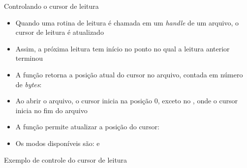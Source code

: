 \begin{frame}[fragile]{Controlando o cursor de leitura}

    \begin{itemize}
        \item Quando uma rotina de leitura é chamada em um \textit{handle} de um arquivo, o cursor
            de leitura é atualizado

        \item Assim, a próxima leitura tem início no ponto no qual a leitura anterior terminou

        \item A função  retorna a posição atual do cursor no arquivo,
            contada em número de \textit{bytes}:


        \item Ao abrir o arquivo, o cursor inicia na posição 0, exceto no
            , onde o cursor inicia no fim do arquivo

        \item A função  permite atualizar a posição do cursor:

            
        \item Os modos disponíveis são:  e
    \end{itemize}

\end{frame}

\begin{frame}[fragile]{Exemplo de controle do cursor de leitura}
\end{frame}

